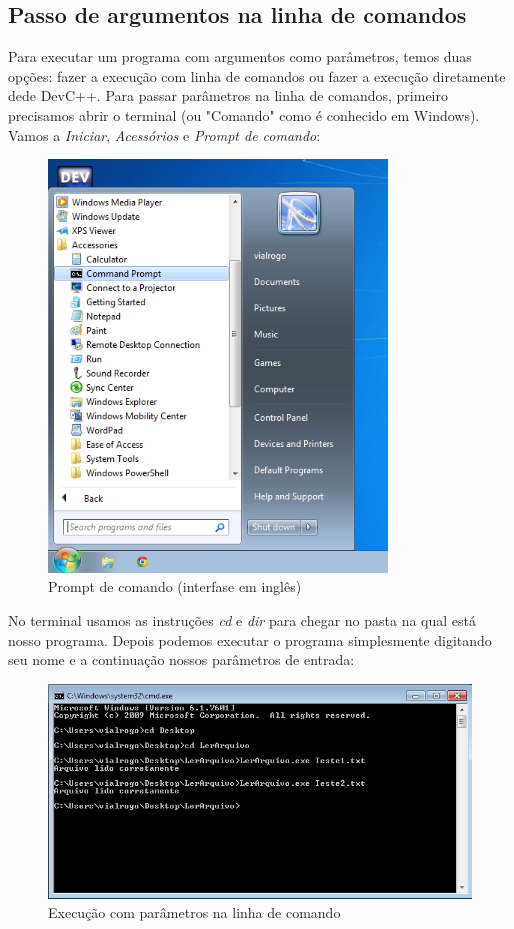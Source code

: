 \documentclass[12pt, a4paper]{article}
\begin{document}
\begin{figure}[H]
  \inputminted[bgcolor=bgdark,style=monokai]{c}{Codigo/programa.c}
\end{figure}

\subsection*{Passo de argumentos na linha de comandos}
Para executar um programa com argumentos como parâmetros, temos duas opções: fazer a execução com linha de comandos ou fazer a execução diretamente dede DevC++.
Para passar parâmetros na linha de comandos, primeiro precisamos abrir o terminal (ou "Comando" como é conhecido em Windows).
Vamos a \emph{Iniciar}, \emph{Acessórios} e \emph{Prompt de comando}:

\begin{figure}[H]
  \centering
  \includegraphics[width=90mm]{Imagens/2.png}
  \caption{Prompt de comando (interfase em inglês)}
\label{fig:2}
\end{figure}

No terminal usamos as instruções \emph{cd} e \emph{dir} para chegar no pasta na qual está nosso programa.
Depois podemos executar o programa simplesmente digitando seu nome e a continuação nossos parâmetros de entrada:

\begin{figure}[H]
  \centering
  \includegraphics[width=140mm]{Imagens/1.png}
  \caption{Execução com parâmetros na linha de comando}
\label{fig:1}
\end{figure}
\end{document}
